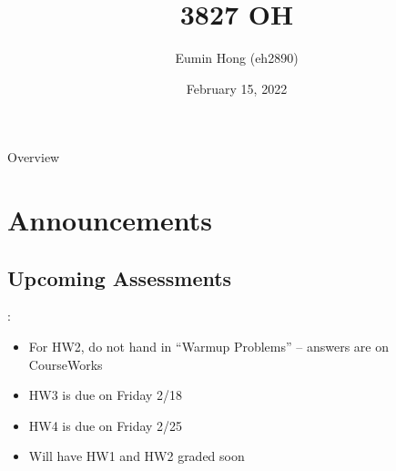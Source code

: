 \documentclass{../slides}
\title{3827 OH}
\author{Eumin Hong (eh2890)}
\institute{Columbia University}
\date{February 15, 2022}
\begin{document}
\begin{frame}
    \titlepage
\end{frame}

\begin{frame}{Overview}
\begin{multicols}{2}
\tableofcontents
\end{multicols}
\end{frame}

\section{Announcements}
\subsection{Upcoming Assessments}
\begin{frame}{\secname: \subsecname}
    \begin{itemize}
        \item For HW2, do not hand in \enquote{Warmup Problems} -- answers are on CourseWorks
        \item HW3 is due on Friday 2/18
        \item HW4 is due on Friday 2/25
        \item Will have HW1 and HW2 graded soon
    \end{itemize}
\end{frame}
\end{document}
